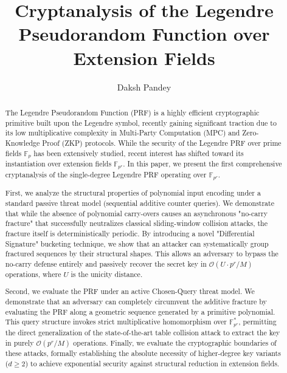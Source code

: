 \documentclass[runningheads]{llncs}
\begin{document}
%
\title{Cryptanalysis of the Legendre Pseudorandom Function over Extension Fields}
%
\author{Daksh Pandey}
%
%
%
\maketitle              
%
\begin{abstract}
The Legendre Pseudorandom Function (PRF) is a highly efficient cryptographic primitive built upon the Legendre symbol, recently gaining significant traction due to its low multiplicative complexity in Multi-Party Computation (MPC) and Zero-Knowledge Proof (ZKP) protocols. While the security of the Legendre PRF over prime fields $\mathbb{F}_p$ has been extensively studied, recent interest has shifted toward its instantiation over extension fields $\mathbb{F}_{p^r}$. In this paper, we present the first comprehensive cryptanalysis of the single-degree Legendre PRF operating over $\mathbb{F}_{p^r}$.

First, we analyze the structural properties of polynomial input encoding under a standard passive threat model (sequential additive counter queries). We demonstrate that while the absence of polynomial carry-overs causes an asynchronous "no-carry fracture" that successfully neutralizes classical sliding-window collision attacks, the fracture itself is deterministically periodic. By introducing a novel "Differential Signature" bucketing technique, we show that an attacker can systematically group fractured sequences by their structural shapes. This allows an adversary to bypass the no-carry defense entirely and passively recover the secret key in $\mathcal{O}(U \cdot p^r/M)$ operations, where $U$ is the unicity distance.

Second, we evaluate the PRF under an active Chosen-Query threat model. We demonstrate that an adversary can completely circumvent the additive fracture by evaluating the PRF along a geometric sequence generated by a primitive polynomial. This query structure invokes strict multiplicative homomorphism over $\mathbb{F}_{p^r}^*$, permitting the direct generalization of the state-of-the-art table collision attack to extract the key in purely $\mathcal{O}(p^r/M)$ operations. Finally, we evaluate the cryptographic boundaries of these attacks, formally establishing the absolute necessity of higher-degree key variants ($d \ge 2$) to achieve exponential security against structural reduction in extension fields.
\end{abstract}
%
%
%
\end{document}
